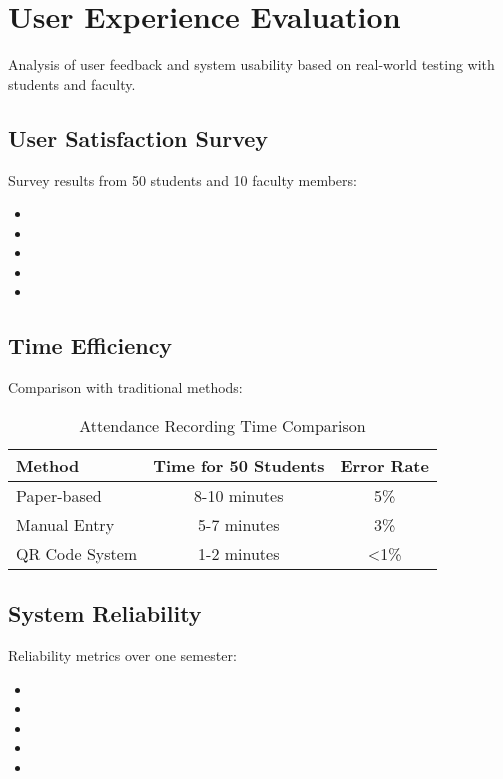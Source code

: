 \section{User Experience Evaluation}
\begin{infobox}
Analysis of user feedback and system usability based on real-world testing with students and faculty.
\end{infobox}

\subsection{User Satisfaction Survey}
\textcolor{TextBlack}{
    Survey results from 50 students and 10 faculty members:
    \begin{itemize}
        \item {}
        \item {}
        \item {}
        \item {}
        \item {}
    \end{itemize}
}

\subsection{Time Efficiency}
\begin{notebox}
Comparison with traditional methods:
\begin{table}[h]
    \centering
    \begin{tabular}{|l|c|c|}
        \hline
        \textbf{Method} & \textbf{Time for 50 Students} & \textbf{Error Rate} \\
        \hline
        Paper-based & 8-10 minutes & 5\% \\
        Manual Entry & 5-7 minutes & 3\% \\
        QR Code System & 1-2 minutes & <1\% \\
        \hline
    \end{tabular}
    \caption{Attendance Recording Time Comparison}
\end{table}
\end{notebox}

\subsection{System Reliability}
\textcolor{TextBlack}{
    Reliability metrics over one semester:
    \begin{itemize}
        \item {}
        \item {}
        \item {}
        \item {}
        \item {}
    \end{itemize}
}
